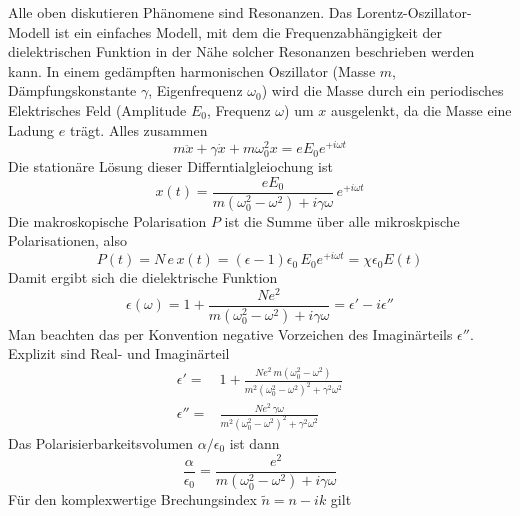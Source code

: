 Alle oben diskutieren Phänomene sind Resonanzen. Das Lorentz-Oszillator-Modell ist ein einfaches Modell, mit dem die Frequenzabhängigkeit der dielektrischen Funktion in der Nähe solcher Resonanzen beschrieben werden kann. In einem gedämpften harmonischen Oszillator (Masse $m$, Dämpfungskonstante $\gamma$, Eigenfrequenz $\omega_0$) wird die Masse durch ein periodisches Elektrisches Feld (Amplitude $E_0$, Frequenz $\omega$) um $x$ ausgelenkt, da die Masse eine Ladung $e$ trägt. Alles zusammen
\begin{equation}
 m \ddot{x} + \gamma \dot{x} + m \omega_0^2  x = e E_0 e^{+ i \omega t}
\end{equation}
Die stationäre Lösung dieser Differntialgleiochung ist
\begin{equation}
 x(t) = \frac{e E_0}{m (\omega_0^2  - \omega^2) + i \gamma \omega} \, e^{+ i \omega t}
\end{equation}
Die makroskopische Polarisation $P$ ist die Summe über alle mikroskpische Polarisationen, also
\begin{equation}
P(t) = N \, e \,x(t) =  (\epsilon -1 ) \epsilon_0 \, E_0 e^{+ i \omega t}
= \chi \epsilon_0 E(t)
\end{equation}
Damit ergibt sich die dielektrische Funktion
\begin{equation}
\epsilon(\omega) = 1 + \frac{N e^2}{m (\omega_0^2  - \omega^2) + i \gamma \omega} = \epsilon' - i \epsilon''
\end{equation}
Man beachten das per Konvention negative Vorzeichen des Imaginärteils $\epsilon''$. Explizit sind Real- und Imaginärteil
\begin{align}
 \epsilon' = & 1 + \frac{N e^2 \, m (\omega_0^2  - \omega^2)}{m^2 (\omega_0^2  - \omega^2)^2 +  \gamma^2 \omega^2}  \\
  \epsilon'' = &  \frac{N e^2 \, \gamma \omega }{m^2 (\omega_0^2  - \omega^2)^2 +  \gamma^2 \omega^2} 
\end{align}
Das Polarisierbarkeitsvolumen $\alpha / \epsilon_0$ ist dann
\begin{equation}
\frac{\alpha}{\epsilon_0} = \frac{e^2}{m (\omega_0^2  - \omega^2) + i \gamma \omega} 
\end{equation}
Für den  komplexwertige Brechungsindex $\tilde{n} = n - i k$ gilt
